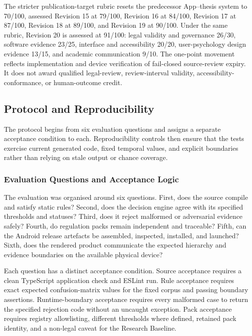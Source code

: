 The stricter publication-target rubric resets the predecessor App--thesis system to 70/100, assessed Revision 15 at 79/100, Revision 16 at 84/100, Revision 17 at 87/100, Revision 18 at 89/100, and Revision 19 at 90/100. Under the same rubric, Revision 20 is assessed at 91/100: legal validity and governance 26/30, software evidence 23/25, interface and accessibility 20/20, user-psychology design evidence 13/15, and academic communication 9/10. The one-point movement reflects implementation and device verification of fail-closed source-review expiry. It does not award qualified legal-review, review-interval validity, accessibility-conformance, or human-outcome credit.

\subsection{Protocol and Reproducibility}

The protocol begins from six evaluation questions and assigns a separate acceptance condition to each. Reproducibility controls then ensure that the tests exercise current generated code, fixed temporal values, and explicit boundaries rather than relying on stale output or chance coverage.

\subsubsection{Evaluation Questions and Acceptance Logic}

The evaluation was organised around six questions. First, does the source compile and satisfy static rules? Second, does the decision engine agree with its specified thresholds and statuses? Third, does it reject malformed or adversarial evidence safely? Fourth, do regulation packs remain independent and traceable? Fifth, can the Android release artefacts be assembled, inspected, installed, and launched? Sixth, does the rendered product communicate the expected hierarchy and evidence boundaries on the available physical device?

Each question has a distinct acceptance condition. Source acceptance requires a clean TypeScript application check and ESLint run. Rule acceptance requires exact expected confusion-matrix values for the fixed corpus and passing boundary assertions. Runtime-boundary acceptance requires every malformed case to return the specified rejection code without an uncaught exception. Pack acceptance requires registry allowlisting, different thresholds where defined, retained pack identity, and a non-legal caveat for the Research Baseline.

